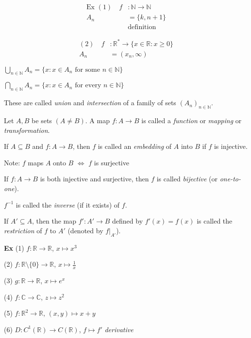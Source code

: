 \documentclass[12pt,a4paper]{article}
\begin{document}
\begin{align*}
\text{Ex } (1) \quad f &: \mathbb{N} \to \mathbb{N} \\
A_n &= \{k, n+1\} \\
&\text{definition}
\end{align*}

\begin{align*}
(2) \quad f &: \mathbb{R}^* \to \{x \in \mathbb{R} : x \geq 0\} \\
A_n &= (x_n, \infty)
\end{align*}

\begin{center}
$\bigcup_{n \in \mathbb{N}} A_n = \{x : x \in A_n \text{ for some } n \in \mathbb{N}\}$

$\bigcap_{n \in \mathbb{N}} A_n = \{x : x \in A_n \text{ for every } n \in \mathbb{N}\}$
\end{center}

These are called \textit{union} and \textit{intersection} of a family of sets $(A_n)_{n \in \mathbb{N}}$.

Let $A, B$ be sets $(A \neq B)$. A map $f : A \to B$ is called a \textit{function} or \textit{mapping} or \textit{transformation}.

If $A \subseteq B$ and $f : A \to B$, then $f$ is called an \textit{embedding} of $A$ into $B$ if $f$ is injective.

Note: $f$ maps $A$ onto $B$ $\Leftrightarrow$ $f$ is surjective

If $f : A \to B$ is both injective and surjective, then $f$ is called \textit{bijective} (or \textit{one-to-one}).

$f^{-1}$ is called the \textit{inverse} (if it exists) of $f$.

If $A' \subseteq A$, then the map $f' : A' \to B$ defined by $f'(x) = f(x)$ is called the \textit{restriction} of $f$ to $A'$ (denoted by $f|_{A'}$).

\textbf{Ex} (1) $f : \mathbb{R} \to \mathbb{R}$, $x \mapsto x^3$

(2) $f : \mathbb{R} \setminus \{0\} \to \mathbb{R}$, $x \mapsto \frac{1}{x}$

(3) $g : \mathbb{R} \to \mathbb{R}$, $x \mapsto e^x$

(4) $f : \mathbb{C} \to \mathbb{C}$, $z \mapsto z^2$

(5) $f : \mathbb{R}^2 \to \mathbb{R}$, $(x,y) \mapsto x+y$

(6) $D : C^1(\mathbb{R}) \to C(\mathbb{R})$, $f \mapsto f'$ \textit{derivative}
\end{document}
